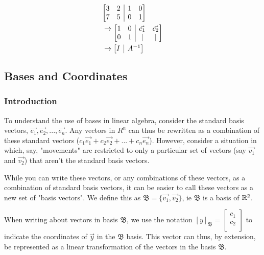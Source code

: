 \documentclass[12pt]{article}
\begin{document}
\begin{equation}
    \begin{split}
        &\begin{array}[t][{@{}cc|cc@{}}]
             3 & 2 & 1 & 0\\
             7 & 5 & 0 & 1\\
            \end{array}\\
            &\rightarrow\begin{array}[t][{@{}cc|cc@{}}]
             1 & 0 & \vec{c_1} & \vec{c_2}\\
             0 & 1 & | & |\\
        \end{array}\\
        &\rightarrow\begin{array}[t][{@{}c|c@{}}]
             I & A^{-1}\\
        \end{array}\\
    \end{split}
\end{equation}

\subsection{Bases and Coordinates}

\subsubsection{Introduction}
To understand the use of bases in linear algebra, consider the standard basis vectors, $\vec{e_1}, \vec{e_2}, ..., \vec{e_n}$. Any vectors in $R^n$ can thus be rewritten as a combination of these standard vectors ($c_1\vec{e_1} + c_2\vec{e_2} + ... + c_n\vec{e_n}$). However, consider a situation in which, say, "movements" are restricted to only a particular set of vectors (say $\vec{v_1}$ and $\vec{v_2}$) that aren't the standard basis vectors. 

While you can write these vectors, or any combinations of these vectors, as a combination of standard basis vectors, it can be easier to call these vectors as a new set of "basis vectors". We define this as $\mathfrak{B} = \{\vec{v_1}, \vec{v_2}\}$, ie $\mathfrak{B}$ is a basis of $\mathbb{R}^2$.

When writing about vectors in basis $\mathfrak{B}$, we use the notation $[y]_{\mathfrak{B}} = \begin{bmatrix}
    c_1\\
    c_2\\
\end{bmatrix}$ to indicate the coordinates of $\Vec{y}$ in the $\mathfrak{B}$ basis. This vector can thus, by extension, be represented as a linear transformation of the vectors in the basis $\mathfrak{B}$.
\end{document}
